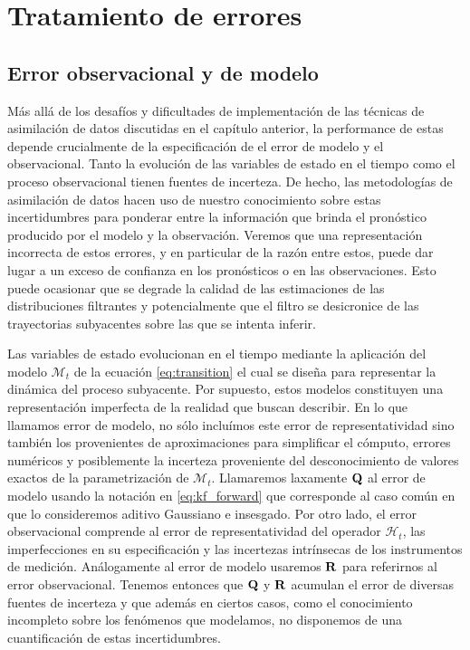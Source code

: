 \chapter{Tratamiento de errores}

\section{Error observacional y de modelo}

Más allá de los desafíos y dificultades de implementación de las técnicas de asimilación de datos discutidas en el capítulo anterior, la performance de estas depende crucialmente de la especificación de el error de modelo y el observacional. Tanto la evolución de las variables de estado en el tiempo como el proceso observacional tienen fuentes de incerteza. De hecho, las metodologías de asimilación de datos hacen uso de nuestro conocimiento sobre estas incertidumbres para ponderar entre la información que brinda el pronóstico producido por el modelo y la observación. Veremos que una representación incorrecta de estos errores, y en particular de la razón entre estos, puede dar lugar a un exceso de confianza en los pronósticos o en las observaciones. Esto puede ocasionar que se degrade la calidad de las estimaciones de las distribuciones filtrantes y potencialmente que el filtro se desicronice de las trayectorias subyacentes sobre las que se intenta inferir.

Las variables de estado evolucionan en el tiempo mediante la aplicación del modelo $\mathcal{M}_t$ de la ecuación \ref{eq:transition} el cual se diseña para representar la dinámica del proceso subyacente. Por supuesto, estos modelos constituyen una representación imperfecta de la realidad que buscan describir. En lo que llamamos error de modelo, no sólo incluímos este error de representatividad sino también los provenientes de aproximaciones para simplificar el cómputo, errores numéricos y posiblemente la incerteza proveniente del desconocimiento de valores exactos de la parametrización de $\mathcal{M}_t$. Llamaremos laxamente $\mathbf{Q}$ al error de modelo usando la notación en \ref{eq:kf_forward} que corresponde al caso común en que lo consideremos aditivo Gaussiano e insesgado. Por otro lado, el error observacional comprende al error de representatividad del operador $\mathcal{H}_t$, las imperfecciones en su especificación y las incertezas intrínsecas de los instrumentos de medición. Análogamente al error de modelo usaremos $\mathbf{R}$ para referirnos al error observacional. Tenemos entonces que $\mathbf{Q}$ y $\mathbf{R}$ acumulan el error de diversas fuentes de incerteza y que además en ciertos casos, como el conocimiento incompleto sobre los fenómenos que modelamos, no disponemos de una cuantificación de estas incertidumbres.


